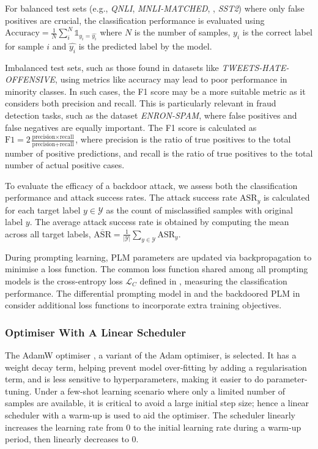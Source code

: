 For balanced test sets (e.g., \textit{QNLI}, \textit{MNLI-MATCHED}, , \textit{SST2}) where only false positives are crucial, the classification performance is evaluated using $\text{Accuracy} = \frac{1}{N} \sum_{i}^N \mathds{1}_{y_i = \hat{y_i}}$ where $N$ is the number of samples, $y_i$ is the correct label for sample $i$ and $\hat{y_i}$ is the predicted label by the model.

Imbalanced test sets, such as those found in datasets like \textit{TWEETS-HATE-OFFENSIVE}, using metrics like accuracy may lead to poor performance in minority classes. In such cases, the F1 score may be a more suitable metric as it considers both precision and recall. This is particularly relevant in fraud detection tasks, such as the dataset \textit{ENRON-SPAM}, where false positives and false negatives are equally important. The F1 score is calculated as $\text{F1} = 2\frac{\text{precision} \times \text{recall}}{\text{precision} + \text{recall}}$, where precision is the ratio of true positives to the total number of positive predictions, and recall is the ratio of true positives to the total number of actual positive cases.

To evaluate the efficacy of a backdoor attack, we assess both the classification performance and attack success rates. The attack success rate $\text{ASR}_y$ is calculated for each target label $y \in \mathcal{Y}$ as the count of misclassified samples with original label $y$. The average attack success rate is obtained by computing the mean across all target labels, $\overline{\text{ASR}} = \frac{1}{|\mathcal{Y}|} \sum_{y \in \mathcal{Y}} \text{ASR}_y$.

During prompting learning, PLM parameters are updated via backpropagation to minimise a loss function. The common loss function shared among all prompting models is the cross-entropy loss $\mathcal{L}_C$ defined in , measuring the classification performance. The differential prompting model in  and the backdoored PLM in  consider additional loss functions to incorporate extra training objectives.

\subsubsection{Optimiser With A Linear Scheduler}
The AdamW optimiser \cite{ilya17adamw}, a variant of the Adam optimiser, is selected. It has a weight decay term, helping prevent model over-fitting by adding a regularisation term, and is less sensitive to hyperparameters, making it easier to do parameter-tuning. Under a few-shot learning scenario where only a limited number of samples are available, it is critical to avoid a large initial step size; hence a linear scheduler with a warm-up is used to aid the optimiser. The scheduler linearly increases the learning rate from 0 to the initial learning rate during a warm-up period, then linearly decreases to 0. 

